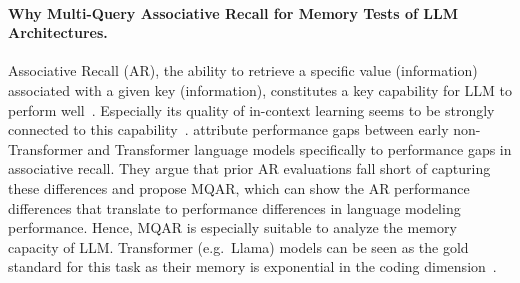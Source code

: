 \documentclass[dvipsnames]{article}
\begin{document}
\begin{appendix}
\paragraph{Why Multi-Query Associative Recall for Memory Tests of LLM Architectures.}
Associative Recall (AR), the ability to retrieve a specific value (information) associated with a given key (information), constitutes a key capability for LLM to perform well~\citep{Poli:24arxiv, Arora:23arxiv, Olsson:22short}.
Especially its quality of in-context learning seems to be strongly connected to this capability~\citep{Olsson:22short}.
\citet{Arora:23arxiv} attribute performance gaps between early non-Transformer and Transformer language models specifically to performance gaps in associative recall.
They argue that prior AR evaluations fall short of capturing these differences and propose MQAR,
which can show the AR performance differences that translate to performance differences in language modeling performance.
Hence, MQAR is especially suitable to analyze the memory capacity of LLM.
Transformer (e.g.\ Llama) models can be seen as the gold standard for this task as their memory
is exponential in the coding dimension~\citep{Ramsauer:21}.

\end{appendix}
\end{document}

